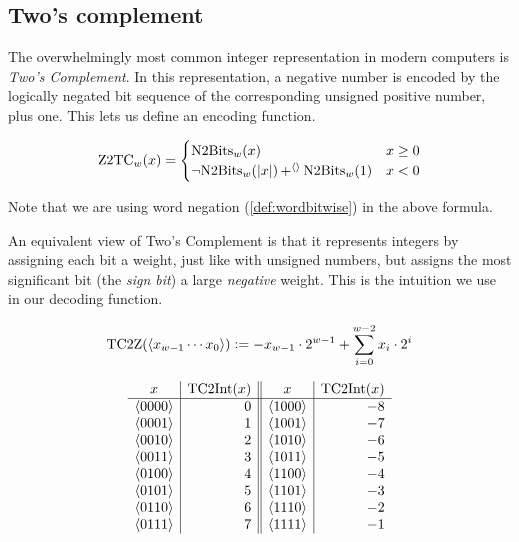 \subsection{Two's complement}
\label{sec:twos-complement}

The overwhelmingly most common integer representation in modern
computers is \emph{Two's Complement}.  In this representation, a
negative number is encoded by the logically negated bit sequence of
the corresponding unsigned positive number, plus one.  This lets us
define an encoding function.

\begin{definition}
\begin{align*}
  \mathrm{Z2TC}_{w}(x) =
  \begin{cases}
    \mathrm{N2Bits}_{w}(x) & x \geq 0 \\
    \neg \mathrm{N2Bits}_{w}(|x|) \operatorname{+^{\langle\rangle}} \mathrm{N2Bits}_{w}(1) & x < 0
  \end{cases}
\end{align*}
\label{def:z2tc}
\end{definition}

Note that we are using word negation (\cref{def:wordbitwise}) in the
above formula.

An equivalent view of Two's Complement is that it represents integers
by assigning each bit a weight, just like with unsigned numbers, but
assigns the most significant bit (the \emph{sign bit}) a large
\emph{negative} weight.  This is the intuition we use in our decoding
function.

\begin{definition}
\begin{align*}
  \mathrm{TC2Z}(\langle x_{w-1}\cdots x_{0} \rangle) \vcentcolon= -x_{w-1}\cdot 2^{w-1} + \sum_{i=0}^{w-2} x_{i} \cdot{} 2^{i}
\end{align*}
\label{def:tc2Z}
\end{definition}

\begin{table}
  \centering
  \[
  \begin{array}{c|r||c|r}
    x & \mathrm{TC2Int}(x) & x & \mathrm{TC2Int}(x) \\\hline
    \langle 0000 \rangle & 0 & \langle 1000 \rangle & -8 \\
    \langle 0001 \rangle & 1 & \langle 1001 \rangle & -7 \\
    \langle 0010 \rangle & 2 & \langle 1010 \rangle & -6 \\
    \langle 0011 \rangle & 3 & \langle 1011 \rangle & -5 \\
    \langle 0100 \rangle & 4 & \langle 1100 \rangle & -4 \\
    \langle 0101 \rangle & 5 & \langle 1101 \rangle & -3 \\
    \langle 0110 \rangle & 6 & \langle 1110 \rangle & -2 \\
    \langle 0111 \rangle & 7 & \langle 1111 \rangle & -1 \\
  \end{array}
  \]
  \caption{All possible four-bit words interpreted as integers using
    Two's Complement representation.}
  \label{tab:twos-complement}
\end{table}


